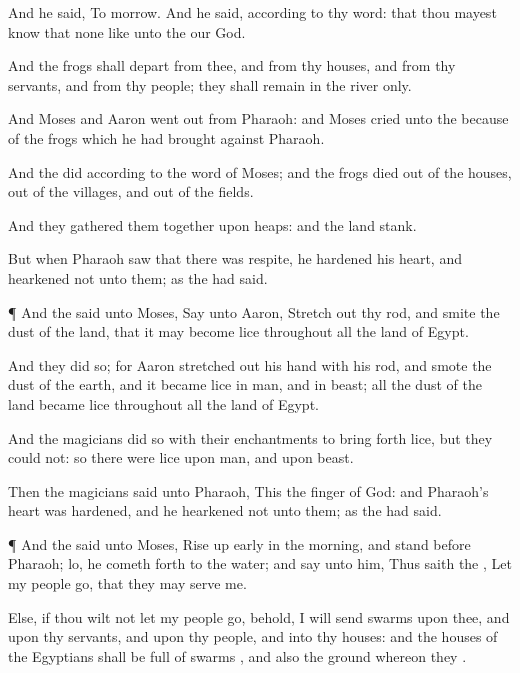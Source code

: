 {And he
said, To
morrow. And he
said,
{} according to thy
word: that thou mayest
know that
{} none like unto the
{} our
God.

And the
frogs shall
depart from thee, and from thy
houses, and from thy
servants, and from thy
people; they shall
remain in the
river only.

And
Moses and
Aaron went
out from
Pharaoh: and
Moses
cried unto the
{} because
of the
frogs which he had
brought against
Pharaoh.

And the
{}
did according to the
word of
Moses; and the
frogs
died out of the
houses, out of the
villages, and out of the
fields.

And they gathered them
together upon
heaps: and the
land
stank.

But when
Pharaoh
saw that there was
respite, he
hardened his
heart, and
hearkened not unto them; as the
{} had
said.


\par }{\PP {}¶ And the
{}
said unto
Moses,
Say unto
Aaron, Stretch
out thy
rod, and
smite the
dust of the
land, that it may become
lice throughout all the
land of
Egypt.

And they
did so; for
Aaron stretched
out his
hand with his
rod, and
smote the
dust of the
earth, and it became
lice in
man, and in
beast; all the
dust of the
land became
lice throughout all the
land of
Egypt.

And the
magicians
did so with their
enchantments to bring
forth
lice, but they
could not: so there were
lice upon
man, and upon
beast.

Then the
magicians
said unto
Pharaoh, This
{} the
finger of
God: and
Pharaoh’s
heart was
hardened, and he
hearkened not unto them; as the
{} had
said.


\par }{\PP {}¶ And the
{}
said unto
Moses, Rise up
early in the
morning, and
stand
before
Pharaoh; lo, he cometh
forth to the
water; and
say unto him, Thus
saith the
{}, Let my
people
go, that they may
serve me.

Else, if thou wilt not let my
people
go, behold, I will
send
swarms
{} upon thee, and upon thy
servants, and upon thy
people, and into thy
houses: and the
houses of the
Egyptians shall be
full of
swarms
{}, and also the
ground whereon they
{}.

}
